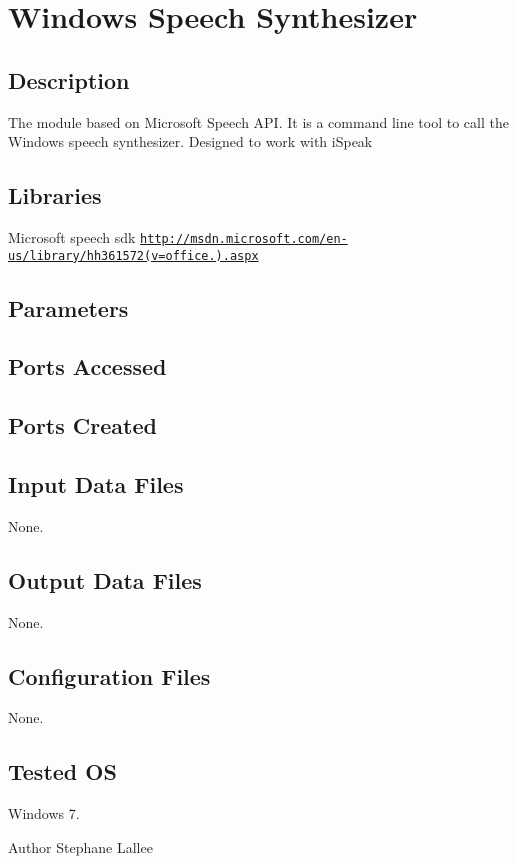 \section{Windows Speech Synthesizer}
\label{group__windows-tts}
\hypertarget{group__windows-tts_intro_sec}{}\subsection{Description}\label{group__windows-tts_intro_sec}
The module based on Microsoft Speech A\+PI. It is a command line tool to call the Windows speech synthesizer. Designed to work with i\+Speak\hypertarget{group__windows-tts_lib_sec}{}\subsection{Libraries}\label{group__windows-tts_lib_sec}
Microsoft speech sdk \href{http://msdn.microsoft.com/en-us/library/hh361572(v=office.14).aspx}{\tt http\+://msdn.\+microsoft.\+com/en-\/us/library/hh361572(v=office.).\+aspx}\hypertarget{group__windows-tts_parameters_sec}{}\subsection{Parameters}\label{group__windows-tts_parameters_sec}
\hypertarget{group__windows-tts_portsa_sec}{}\subsection{Ports Accessed}\label{group__windows-tts_portsa_sec}
\hypertarget{group__windows-tts_portsc_sec}{}\subsection{Ports Created}\label{group__windows-tts_portsc_sec}
\hypertarget{group__windows-tts_in_files_sec}{}\subsection{Input Data Files}\label{group__windows-tts_in_files_sec}
None.\hypertarget{group__windows-tts_out_data_sec}{}\subsection{Output Data Files}\label{group__windows-tts_out_data_sec}
None.\hypertarget{group__windows-tts_conf_file_sec}{}\subsection{Configuration Files}\label{group__windows-tts_conf_file_sec}
None.\hypertarget{group__windows-tts_tested_os_sec}{}\subsection{Tested OS}\label{group__windows-tts_tested_os_sec}
Windows 7.

\begin{DoxyAuthor}{Author}
Stephane Lallee 
\end{DoxyAuthor}
